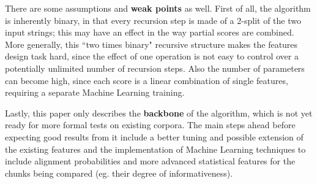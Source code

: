There are some assumptions and \textbf{weak points} as well. First of all, the algorithm is inherently binary, in that every recursion step is made of a 2-split of the two input strings; this may have an effect in the way partial scores are combined. More generally, this ``two times binary" recursive structure makes the features design task hard, since the effect of one operation is not easy to control over a potentially unlimited number of recursion steps. Also the number of parameters can become high, since each score is a linear combination of single features, requiring a separate Machine Learning training.

Lastly, this paper only describes the \textbf{backbone} of the algorithm, which is not yet ready for more formal tests on existing corpora. The main steps ahead before expecting good results from it include a better tuning and possible extension of the existing features  and the implementation of Machine Learning techniques to include alignment probabilities and more advanced statistical features for the chunks being compared (eg. their degree of informativeness).





